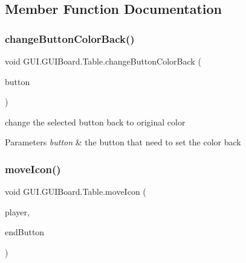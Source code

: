 \subsection{Member Function Documentation}
\mbox{\label{class_g_u_i_1_1_g_u_i_board_1_1_table_a4cfeeb28e2ada796495560fc712ed32f}} 
\subsubsection{\texorpdfstring{change\+Button\+Color\+Back()}{changeButtonColorBack()}}
{\footnotesize\ttfamily void G\+U\+I.\+G\+U\+I\+Board.\+Table.\+change\+Button\+Color\+Back (\begin{DoxyParamCaption}\item[{J\+Button}]{button }\end{DoxyParamCaption})\hspace{0.3cm}{\ttfamily [inline]}}

change the selected button back to original color 
\begin{DoxyParams}{Parameters}
{\em button} & the button that need to set the color back \\
\hline
\end{DoxyParams}
\mbox{\label{class_g_u_i_1_1_g_u_i_board_1_1_table_a311b401d6ee3d8e7a391a6b20e476de4}} 
\subsubsection{\texorpdfstring{move\+Icon()}{moveIcon()}}
{\footnotesize\ttfamily void G\+U\+I.\+G\+U\+I\+Board.\+Table.\+move\+Icon (\begin{DoxyParamCaption}\item[{int}]{player,  }\item[{J\+Button}]{end\+Button }\end{DoxyParamCaption})\hspace{0.3cm}{\ttfamily [inline]}}

